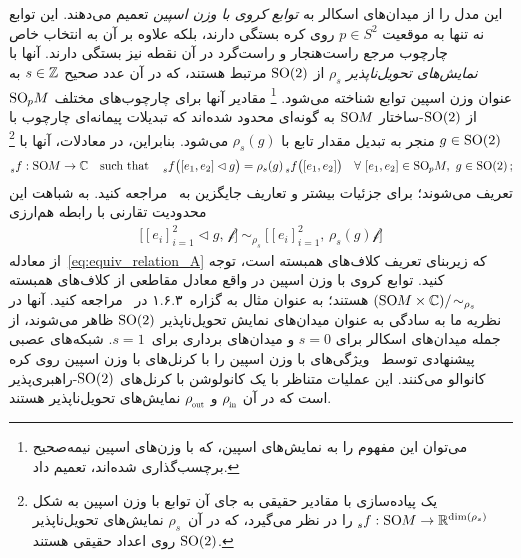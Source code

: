 \citet{esteves2020spinweighted} این مدل را از میدان‌های اسکالر به \emph{توابع کروی با وزن اسپین} تعمیم می‌دهند.
این توابع نه تنها به موقعیت $p\in S^2$ روی کره بستگی دارند، بلکه علاوه بر آن به انتخاب خاص چارچوب مرجع راست‌هنجار و راست‌گرد در آن نقطه نیز بستگی دارند.
آنها با \emph{نمایش‌های تحویل‌ناپذیر} $\rho_s$ از $\operatorname{SO}(2)$ مرتبط هستند، که در آن عدد صحیح $s\in\mathbb{Z}$ به عنوان وزن اسپین توابع شناخته می‌شود.%
\footnote{
	می‌توان این مفهوم را به نمایش‌های اسپین، که با وزن‌های اسپین نیمه‌صحیح برچسب‌گذاری شده‌اند، تعمیم داد.
}
مقادیر آنها برای چارچوب‌های مختلف $\operatorname{SO}_{\mkern-1.1mu p}\mkern-3.2muM$ از $\operatorname{SO}(2)$-ساختار $\operatorname{SO}\mkern-3.6muM$ به گونه‌ای محدود شده‌اند که تبدیلات پیمانه‌ای چارچوب با $g\in\operatorname{SO}(2)$ منجر به تبدیل مقدار تابع با $\rho_s(g)$ می‌شود.
بنابراین، در معادلات، آنها با%
\footnote{
	یک پیاده‌سازی با مقادیر حقیقی به جای آن توابع با وزن اسپین به شکل $\prescript{}{s}f: \operatorname{SO}\mkern-3.6muM \to \mathbb{R}^{\dim(\rho_s)}$ را در نظر می‌گیرد، که در آن~$\rho_s$ نمایش‌های تحویل‌ناپذیر $\operatorname{SO}(2)$ روی اعداد حقیقی هستند.
}
\begin{align}
	\prescript{}{s}f: \operatorname{SO}\mkern-3.6muM \to \mathbb{C}
	\ \ \ \textup{such that} \ \ \
	\prescript{}{s}f\big( [e_1,e_2] \lhd g \big) = \rho_s(g) \prescript{}{s}f \big( [e_1,e_2] \big)
	\ \ \ \forall\ [e_1,e_2] \in \operatorname{SO}_{\mkern-1.1mu p}\mkern-3.2muM,\ g\in\operatorname{SO}(2) \,;\!
\end{align}
تعریف می‌شوند؛ برای جزئیات بیشتر و تعاریف جایگزین به~\cite{boyle2016should} مراجعه کنید.
به شباهت این محدودیت تقارنی با رابطه هم‌ارزی
\begin{align}
	\big[ [e_i]_{i=1}^2 \lhd g,\, \mathscr{f} \big]\ \sim_{\rho_s}\ \big[ [e_i]_{i=1}^2,\, \rho_s(g) \mathscr{f} \big]
\end{align}
از معادله~\eqref{eq:equiv_relation_A} که زیربنای تعریف کلاف‌های همبسته است، توجه کنید.
توابع کروی با وزن اسپین در واقع معادل مقاطعی از کلاف‌های همبسته
$(\operatorname{SO}\mkern-3.6muM \times \mathbb{C})/\!\sim_{\rho_s}$ هستند؛
به عنوان مثال به گزاره~۱.۶.۳ در~\cite{wendlLectureNotesBundles2008} مراجعه کنید.
آنها در نظریه ما به سادگی به عنوان میدان‌های نمایش تحویل‌ناپذیر $\operatorname{SO}(2)$ ظاهر می‌شوند، از جمله میدان‌های اسکالر برای $s=0$ و میدان‌های برداری برای~$s=1$.
شبکه‌های عصبی پیشنهادی توسط~\citet{esteves2020spinweighted} ویژگی‌های با وزن اسپین را با کرنل‌های با وزن اسپین روی کره کانوالو می‌کنند.
این عملیات متناظر با یک کانولوشن با کرنل‌های $\operatorname{SO}(2)$-راهبری‌پذیر است که در آن $\rhoin$ و $\rhoout$ نمایش‌های تحویل‌ناپذیر هستند.


